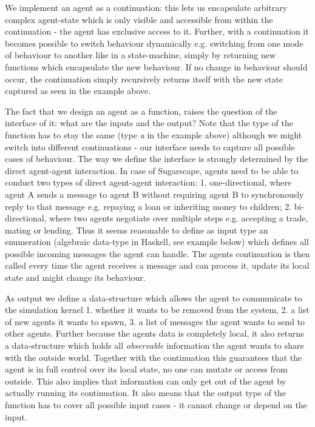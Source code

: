We implement an agent as a continuation: this lets us encapsulate arbitrary complex agent-state which is only visible and accessible from within the continuation - the agent has exclusive access to it. Further, with a continuation it becomes possible to switch behaviour dynamically e.g. switching from one mode of behaviour to another like in a state-machine, simply by returning new functions which encapsulate the new behaviour. If no change in behaviour should occur, the continuation simply recursively returns itself with the new state captured as seen in the example above.

The fact that we design an agent as a function, raises the question of the interface of it: what are the inputs and the output? Note that the type of the function has to stay the same (type \textit{a} in the example above) although we might switch into different continuations - our interface needs to capture all possible cases of behaviour. The way we define the interface is strongly determined by the direct agent-agent interaction. In case of Sugarscape, agents need to be able to conduct two types of direct agent-agent interaction: 1. one-directional, where agent A sends a message to agent B without requiring agent B to synchronously reply to that message e.g. repaying a loan or inheriting money to children; 2. bi-directional, where two agents negotiate over multiple steps e.g. accepting a trade, mating or lending. Thus it seems reasonable to define as input type an enumeration (algebraic data-type in Haskell, see example below) which defines all possible incoming messages the agent can handle. The agents continuation is then called every time the agent receives a message and can process it, update its local state and might change its behaviour.

As output we define a data-structure which allows the agent to communicate to the simulation kernel 1. whether it wants to be removed from the system, 2. a list of new agents it wants to spawn, 3. a list of messages the agent wants to send to other agents. Further because the agents data is completely local, it also returns a data-structure which holds all \textit{observable} information the agent wants to share with the outside world. Together with the continuation this guarantees that the agent is in full control over its local state, no one can mutate or access from outside. This also implies that information can only get out of the agent by actually running its continuation. It also means that the output type of the function has to cover all possible input cases - it cannot change or depend on the input. 


